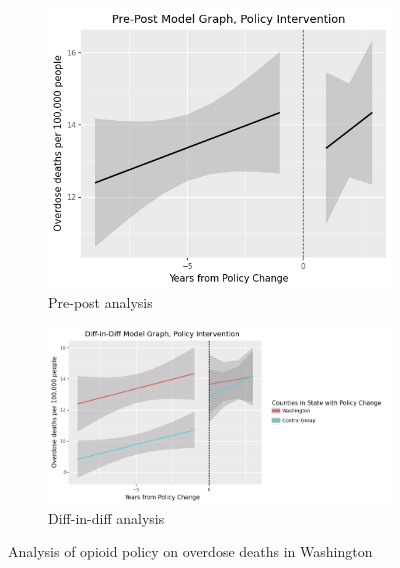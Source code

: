 \documentclass[12pt,letterpaper]{article}
\begin{document}
\begin{figure}[!h]
\centering
\begin{subfigure}{.5\textwidth}
  \centering
  \includegraphics[width=0.7\linewidth]{../30_results/General_Results/washington_overdose_death_prepost.png}
  \caption{Pre-post analysis}
  \label{fig:wa_death_prepost}
\end{subfigure}%
\begin{subfigure}{.55\textwidth}
  \centering
  \includegraphics[width=1\linewidth]{../30_results/General_Results/washington_overdose_death_diffdiff.png}
  \caption{Diff-in-diff analysis}
  \label{fig:wa_death_did}
\end{subfigure}
\caption{Analysis of opioid policy on overdose deaths in Washington}
\label{fig:wa_death}
\end{figure}
\end{document}

